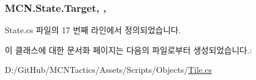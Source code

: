 \subsubsection[{\texorpdfstring{Target}{Target}}]{ M\+C\+N.\+State.\+Target\hspace{0.3cm}{\ttfamily [get]}, {\ttfamily [protected]}, {\ttfamily [inherited]}}\hypertarget{class_m_c_n_1_1_state_a79a563b32f183c9adc9a96679fc57eb8}{}\label{class_m_c_n_1_1_state_a79a563b32f183c9adc9a96679fc57eb8}


State.\+cs 파일의 17 번째 라인에서 정의되었습니다.



이 클래스에 대한 문서화 페이지는 다음의 파일로부터 생성되었습니다.\+:\begin{DoxyCompactItemize}
\item 
D\+:/\+Git\+Hub/\+M\+C\+N\+Tactics/\+Assets/\+Scripts/\+Objects/\hyperlink{_tile_8cs}{Tile.\+cs}\end{DoxyCompactItemize}
